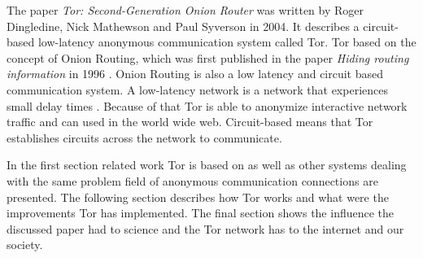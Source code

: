 
The paper \textit{Tor: Second-Generation Onion Router} was written by Roger Dingledine, Nick Mathewson and Paul Syverson in 2004. 
It describes a circuit-based low-latency anonymous communication system called Tor. 
Tor based on the concept of Onion Routing, which was first published in the paper \textit{Hiding routing information} in 1996 \cite{goldschlag1996hiding}. 
Onion Routing is also a low latency and circuit based communication system.
A low-latency network is a network that experiences small delay times \cite{latency}.
Because of that Tor is able to anonymize interactive network traffic and can used in the world wide web. Circuit-based means that Tor establishes circuits across the network to communicate. 



In the first section related work Tor is based on as well as other systems dealing with the same problem field of anonymous communication connections are presented. The following section describes how Tor works and what were the improvements Tor has implemented. The final section shows the influence the discussed paper had to science and the Tor network has to the internet and our society.